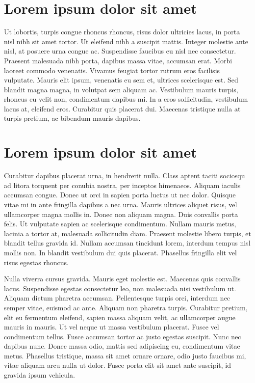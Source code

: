 \section{Lorem ipsum dolor sit amet}\label{sec:LABEL_CHP_1_SEC_H}
Ut lobortis, turpis congue rhoncus rhoncus, risus dolor ultricies lacus, in porta nisl nibh sit amet tortor. Ut eleifend nibh a suscipit mattis. Integer molestie ante nisl, at posuere urna congue ac. Suspendisse faucibus eu nisl nec consectetur. Praesent malesuada nibh porta, dapibus massa vitae, accumsan erat. Morbi laoreet commodo venenatis. Vivamus feugiat tortor rutrum eros facilisis vulputate. Mauris elit ipsum, venenatis eu sem et, ultrices scelerisque est. Sed blandit magna magna, in volutpat sem aliquam ac. Vestibulum mauris turpis, rhoncus eu velit non, condimentum dapibus mi. In a eros sollicitudin, vestibulum lacus at, eleifend eros. Curabitur quis placerat dui. Maecenas tristique nulla at turpis pretium, ac bibendum mauris dapibus.

\section{Lorem ipsum dolor sit amet}\label{sec:LABEL_CHP_1_SEC_I}
Curabitur dapibus placerat urna, in hendrerit nulla. Class aptent taciti sociosqu ad litora torquent per conubia nostra, per inceptos himenaeos. Aliquam iaculis accumsan congue. Donec ut orci in sapien porta luctus ut nec dolor. Quisque vitae mi in ante fringilla dapibus a nec urna. Mauris ultrices aliquet risus, vel ullamcorper magna mollis in. Donec non aliquam magna. Duis convallis porta felis. Ut vulputate sapien ac scelerisque condimentum. Nullam mauris metus, lacinia a tortor at, malesuada sollicitudin diam. Praesent molestie libero turpis, et blandit tellus gravida id. Nullam accumsan tincidunt lorem, interdum tempus nisl mollis non. In blandit vestibulum dui quis placerat. Phasellus fringilla elit vel risus egestas rhoncus.

Nulla viverra cursus gravida. Mauris eget molestie est. Maecenas quis convallis lacus. Suspendisse egestas consectetur leo, non malesuada nisi vestibulum ut. Aliquam dictum pharetra accumsan. Pellentesque turpis orci, interdum nec semper vitae, euismod ac ante. Aliquam non pharetra turpis. Curabitur pretium, elit eu fermentum eleifend, sapien massa aliquam velit, ac ullamcorper augue mauris in mauris. Ut vel neque ut massa vestibulum placerat. Fusce vel condimentum tellus. Fusce accumsan tortor ac justo egestas suscipit. Nunc nec dapibus nunc. Donec massa odio, mattis sed adipiscing eu, condimentum vitae metus. Phasellus tristique, massa sit amet ornare ornare, odio justo faucibus mi, vitae aliquam arcu nulla ut dolor. Fusce porta elit sit amet ante suscipit, id gravida ipsum vehicula.

